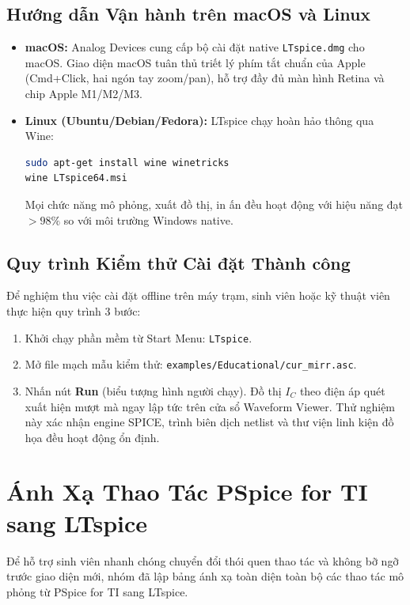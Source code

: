 \documentclass[12pt,a4paper]{report}
\begin{document}
\section{Hướng dẫn Vận hành trên macOS và Linux}
\begin{itemize}
    \item \textbf{macOS:} Analog Devices cung cấp bộ cài đặt native \texttt{LTspice.dmg} cho macOS. Giao diện macOS tuân thủ triết lý phím tắt chuẩn của Apple (Cmd+Click, hai ngón tay zoom/pan), hỗ trợ đầy đủ màn hình Retina và chip Apple M1/M2/M3.
    \item \textbf{Linux (Ubuntu/Debian/Fedora):} LTspice chạy hoàn hảo thông qua Wine:
\begin{lstlisting}[language=bash]
sudo apt-get install wine winetricks
wine LTspice64.msi
\end{lstlisting}
    Mọi chức năng mô phỏng, xuất đồ thị, in ấn đều hoạt động với hiệu năng đạt $>98\%$ so với môi trường Windows native.
\end{itemize}

\section{Quy trình Kiểm thử Cài đặt Thành công}
Để nghiệm thu việc cài đặt offline trên máy trạm, sinh viên hoặc kỹ thuật viên thực hiện quy trình 3 bước:
\begin{enumerate}
    \item Khởi chạy phần mềm từ Start Menu: \texttt{LTspice}.
    \item Mở file mạch mẫu kiểm thử: \lstinline|examples/Educational/cur_mirr.asc|.
    \item Nhấn nút \textbf{Run} (biểu tượng hình người chạy). Đồ thị $I_C$ theo điện áp quét xuất hiện mượt mà ngay lập tức trên cửa sổ Waveform Viewer. Thử nghiệm này xác nhận engine SPICE, trình biên dịch netlist và thư viện linh kiện đồ họa đều hoạt động ổn định.
\end{enumerate}

\chapter{Ánh Xạ Thao Tác PSpice for TI sang LTspice}

Để hỗ trợ sinh viên nhanh chóng chuyển đổi thói quen thao tác và không bỡ ngỡ trước giao diện mới, nhóm đã lập bảng ánh xạ toàn diện toàn bộ các thao tác mô phỏng từ PSpice for TI sang LTspice.
\end{document}
